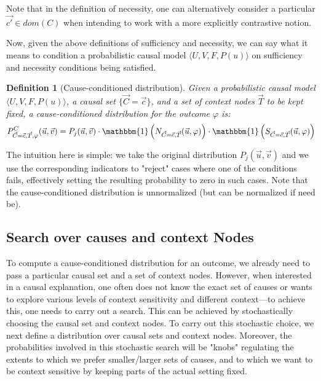 \documentclass{article}
\newtheorem{definition}{Definition}
\begin{document}
\noindent Note that in the definition of necessity, one can alternatively consider a particular \(\vec{c'}\in \mathit{dom}(C)\) when intending to work with a more explicitly contrastive notion. 

Now, given the above definitions of sufficiency and necessity, we can say what it means to condition a probabilistic causal model \(\langle U, V, F, P(u) \rangle\) on sufficiency and necessity conditions being satisfied.



\begin{definition}[Cause-conditioned distribution]\label{def:cause-conditioned}
    Given a probabilistic causal model \(\langle U, V, F, P(u) \rangle\), a causal set \(\{\vec{C} = \vec{c}\}\), and a set of context nodes \(\vec{T}\) to be kept fixed, a cause-conditioned distribution for the outcome \(\varphi\) is:
    \[P^C_{\vec{C} = \vec{c}, \vec{T}, \varphi}(\vec{u}, \vec{v}) = P_j(\vec{u}, \vec{v}) \cdot \mathbbm{1}\left(N_{\vec{C} = \vec{c}, \vec{T}}(\vec{u}, \varphi)\right) \cdot \mathbbm{1}\left(S_{\vec{C} = \vec{c}, \vec{T}}(\vec{u}, \varphi)\right)\]
\end{definition}


\noindent The intuition here is simple: we take the original distribution $P_j(\vec{u}, \vec{v})$ and we use the corresponding indicators to "reject" cases where one of the conditions fails, effectively setting the resulting probability to zero in such cases.  Note that the cause-conditioned distribution is unnormalized (but can be normalized if need be). 

\subsection{Search over causes and context Nodes}

To compute a cause-conditioned distribution for an outcome, we already need to pass a particular causal set and a set of context nodes. However,  when interested in a causal explanation, one often does not know the exact set of causes or wants to explore various levels of context sensitivity and different context---to achieve this, one needs to carry out a search. This can be achieved by stochastically choosing the causal set and context nodes. To carry out this stochastic choice, we next define a distribution over causal sets and context nodes. Moreover, the probabilities involved in this stochastic search will be "knobs" regulating the extents to which we prefer smaller/larger sets of causes, and to which we want to be context sensitive by keeping parts of the actual setting fixed.
\end{document}
